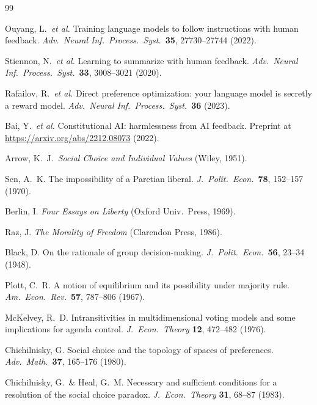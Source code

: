 \documentclass[10pt]{article}
\theoremstyle{definition}
\theoremstyle{remark}
\begin{document}

\begin{thebibliography}{99}\setlength{\itemsep}{1pt}

 Ouyang, L.\ \emph{et al.} Training language models to follow instructions with human feedback. \emph{Adv.\ Neural Inf.\ Process.\ Syst.}\ \textbf{35}, 27730--27744 (2022).

 Stiennon, N.\ \emph{et al.} Learning to summarize with human feedback. \emph{Adv.\ Neural Inf.\ Process.\ Syst.}\ \textbf{33}, 3008--3021 (2020).

 Rafailov, R.\ \emph{et al.} Direct preference optimization: your language model is secretly a reward model. \emph{Adv.\ Neural Inf.\ Process.\ Syst.}\ \textbf{36} (2023).

 Bai, Y.\ \emph{et al.} Constitutional AI: harmlessness from AI feedback. Preprint at \url{https://arxiv.org/abs/2212.08073} (2022).

 Arrow, K.\ J.\ \emph{Social Choice and Individual Values} (Wiley, 1951).

 Sen, A.\ K. The impossibility of a Paretian liberal. \emph{J.\ Polit.\ Econ.}\ \textbf{78}, 152--157 (1970).

 Berlin, I. \emph{Four Essays on Liberty} (Oxford Univ.\ Press, 1969).

 Raz, J. \emph{The Morality of Freedom} (Clarendon Press, 1986).

 Black, D. On the rationale of group decision-making. \emph{J.\ Polit.\ Econ.}\ \textbf{56}, 23--34 (1948).

 Plott, C.\ R. A notion of equilibrium and its possibility under majority rule. \emph{Am.\ Econ.\ Rev.}\ \textbf{57}, 787--806 (1967).

 McKelvey, R.\ D. Intransitivities in multidimensional voting models and some implications for agenda control. \emph{J.\ Econ.\ Theory} \textbf{12}, 472--482 (1976).

 Chichilnisky, G. Social choice and the topology of spaces of preferences. \emph{Adv.\ Math.}\ \textbf{37}, 165--176 (1980).

 Chichilnisky, G.\ \& Heal, G.\ M. Necessary and sufficient conditions for a resolution of the social choice paradox. \emph{J.\ Econ.\ Theory} \textbf{31}, 68--87 (1983).


\end{thebibliography}
\end{document}
